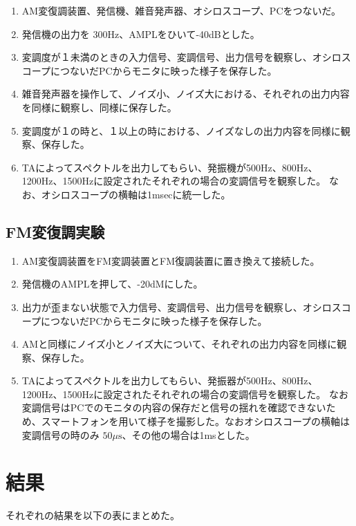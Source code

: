 \documentclass[11pt,a4j]{jsarticle}
\begin{document}
\begin{enumerate}
    \item AM変復調装置、発信機、雑音発声器、オシロスコープ、PCをつないだ。
    \item 発信機の出力を 300Hz、AMPLをひいて-40dBとした。
    \item 変調度が１未満のときの入力信号、変調信号、出力信号を観察し、オシロスコープにつないだPCからモニタに映った様子を保存した。
    \item 雑音発声器を操作して、ノイズ小、ノイズ大における、それぞれの出力内容を同様に観察し、同様に保存した。
    \item 変調度が１の時と、１以上の時における、ノイズなしの出力内容を同様に観察、保存した。
    \item TAによってスペクトルを出力してもらい、発振機が500Hz、800Hz、1200Hz、1500Hzに設定されたそれぞれの場合の変調信号を観察した。
    なお、オシロスコープの横軸は1msecに統一した。
\end{enumerate}

\subsection{FM変復調実験}

\begin{enumerate}
	\item AM変復調装置をFM変調装置とFM復調装置に置き換えて接続した。
	\item 発信機のAMPLを押して、-20dMにした。
	\item 出力が歪まない状態で入力信号、変調信号、出力信号を観察し、オシロスコープにつないだPCからモニタに映った様子を保存した。
	\item AMと同様にノイズ小とノイズ大について、それぞれの出力内容を同様に観察、保存した。
	\item TAによってスペクトルを出力してもらい、発振器が500Hz、800Hz、1200Hz、1500Hzに設定されたそれぞれの場合の変調信号を観察した。
	なお変調信号はPCでのモニタの内容の保存だと信号の揺れを確認できないため、スマートフォンを用いて様子を撮影した。なおオシロスコープの横軸は変調信号の時のみ $50 \mu  \mathrm{s}$、その他の場合は1msとした。
\end{enumerate}





\section{結果}
それぞれの結果を以下の表にまとめた。
\end{document}

